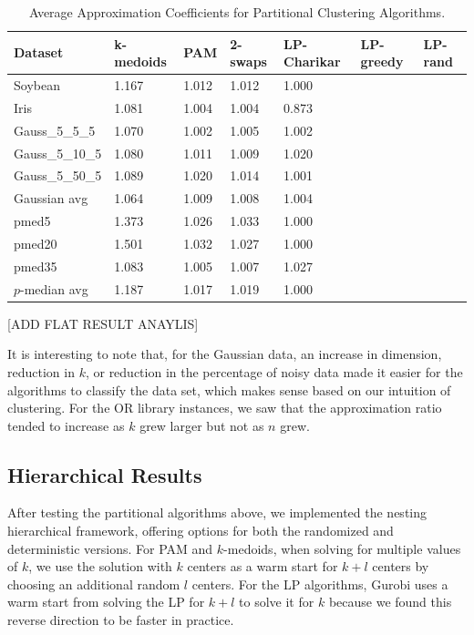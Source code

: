 \documentclass[conference, 10pt, final]{IEEEtran}
\begin{document}
\begin{table}[!t]
\caption{Average Approximation Coefficients for Partitional Clustering Algorithms.}
\centering
\begin{tabular}{ | l | l | l | l | l | l| l|}
\hline
Dataset	&	k-medoids	&	PAM	&	2-swaps	&	LP-Charikar	&	LP-greedy	&	LP-rand	\\ \hline
Soybean	&	1.167	&	1.012	&	1.012	&	1.000	&		&		\\
Iris	&	1.081	&	1.004	&	1.004	&	0.873	&		&		\\
Gauss\_5\_5\_5	&	1.070	&	1.002	&	1.005	&	1.002	&		&		\\
Gauss\_5\_10\_5	&	1.080	&	1.011	&	1.009	&	1.020	&		&		\\
Gauss\_5\_50\_5	&	1.089	&	1.020	&	1.014	&	1.001	&		&		\\
Gaussian avg	&	1.064	&	1.009	&	1.008	&	1.004	&		&		\\
pmed5	&	1.373	&	1.026	&	1.033	&	1.000	&		&		\\
pmed20	&	1.501	&	1.032	&	1.027	&	1.000	&		&		\\
pmed35	&	1.083	&	1.005	&	1.007	&	1.027	&		&		\\
$p$-median avg	&	1.187	&	1.017	&	1.019	&	1.000	&		&		\\ \hline
\end{tabular}
\label{fig:flat_results_approx}
\end{table}


[ADD FLAT RESULT ANAYLIS]

It is interesting to note that, for the Gaussian data, an increase in dimension, reduction in $k$, or reduction in the percentage of noisy data made it easier for the algorithms to classify the data set, which makes sense based on our intuition of clustering. For the OR library instances, we saw that the approximation ratio tended to increase as $k$ grew larger but not as $n$ grew. 

\subsection{Hierarchical Results}
After testing the partitional algorithms above, we implemented the nesting hierarchical framework, offering options for both the randomized and deterministic versions. For PAM and $k$-medoids, when solving for multiple values of $k$, we use the solution with $k$ centers as a warm start for $k+l$ centers by choosing an additional random $l$ centers. For the LP algorithms, Gurobi uses a warm start from solving the LP for $k+l$ to solve it for $k$ because we found this reverse direction to be faster in practice. 
\end{document}
